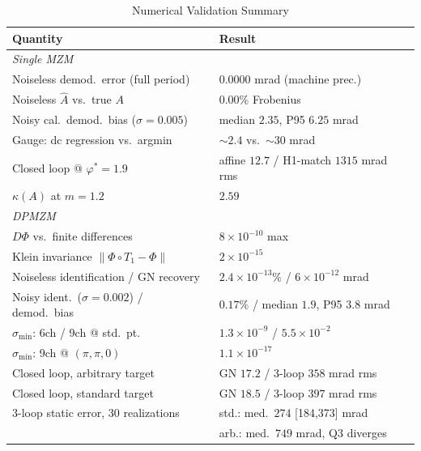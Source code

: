 \documentclass[journal]{IEEEtran}
\begin{document}
\begin{table}[!t]
\caption{Numerical Validation Summary}
\label{tab:results}
\centering
\scriptsize
\setlength{\tabcolsep}{2.5pt}
\begin{tabular}{ll}
\toprule
Quantity & Result\\
\midrule
\multicolumn{2}{l}{\emph{Single MZM}}\\
Noiseless demod.\ error (full period) & $0.0000$ mrad (machine prec.)\\
Noiseless $\hat A$ vs.\ true $A$ & $0.00\%$ Frobenius\\
Noisy cal.\ demod.\ bias ($\sigma{=}0.005$) & median $2.35$, P95 $6.25$ mrad\\
Gauge: dc regression vs.\ argmin & ${\sim}2.4$ vs.\ ${\sim}30$ mrad\\
Closed loop @ $\varphi^\ast{=}1.9$ & affine $12.7$ / H1-match $1315$ mrad rms\\
$\kappa(A)$ at $m{=}1.2$ & $2.59$\\
\midrule
\multicolumn{2}{l}{\emph{DPMZM}}\\
$D\Phi$ vs.\ finite differences & $8\times10^{-10}$ max\\
Klein invariance $\|\Phi\circ T_1-\Phi\|$ & $2\times10^{-15}$\\
Noiseless identification / GN recovery & $2.4\times10^{-13}\%$ / $6\times10^{-12}$ mrad\\
Noisy ident.\ ($\sigma{=}0.002$) / demod.\ bias & $0.17\%$ / median $1.9$, P95 $3.8$ mrad\\
$\sigma_{\min}$: 6ch / 9ch @ std.\ pt. & $1.3\times10^{-9}$ / $5.5\times10^{-2}$\\
$\sigma_{\min}$: 9ch @ $(\pi,\pi,0)$ & $1.1\times10^{-17}$\\
Closed loop, arbitrary target & GN $17.2$ / 3-loop $358$ mrad rms\\
Closed loop, standard target & GN $18.5$ / 3-loop $397$ mrad rms\\
3-loop static error, 30 realizations & std.: med.\ $274$ [184,373] mrad\\
 & arb.: med.\ $749$ mrad, Q3 diverges\\
\bottomrule
\end{tabular}
\end{table}
\end{document}
